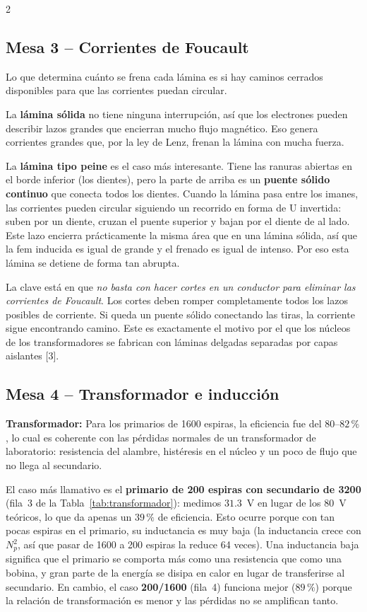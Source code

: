 \documentclass[10pt]{article}
\begin{document}
\begin{multicols}{2}
\subsection*{Mesa 3 – Corrientes de Foucault}

Lo que determina cuánto se frena cada lámina es si hay caminos cerrados disponibles para que las corrientes puedan circular.

La \textbf{lámina sólida} no tiene ninguna interrupción, así que los electrones pueden describir lazos grandes que encierran mucho flujo magnético. Eso genera corrientes grandes que, por la ley de Lenz, frenan la lámina con mucha fuerza.

La \textbf{lámina tipo peine} es el caso más interesante. Tiene las ranuras abiertas en el borde inferior (los dientes), pero la parte de arriba es un \textbf{puente sólido continuo} que conecta todos los dientes. Cuando la lámina pasa entre los imanes, las corrientes pueden circular siguiendo un recorrido en forma de U invertida: suben por un diente, cruzan el puente superior y bajan por el diente de al lado. Este lazo encierra prácticamente la misma área que en una lámina sólida, así que la fem inducida es igual de grande y el frenado es igual de intenso. Por eso esta lámina se detiene de forma tan abrupta.

La clave está en que \emph{no basta con hacer cortes en un conductor para eliminar las corrientes de Foucault}. Los cortes deben romper completamente todos los lazos posibles de corriente. Si queda un puente sólido conectando las tiras, la corriente sigue encontrando camino. Este es exactamente el motivo por el que los núcleos de los transformadores se fabrican con láminas delgadas separadas por capas aislantes [3].

\subsection*{Mesa 4 – Transformador e inducción}

\textbf{Transformador:} Para los primarios de 1600 espiras, la eficiencia fue del $80$--$82\,\%$, lo cual es coherente con las pérdidas normales de un transformador de laboratorio: resistencia del alambre, histéresis en el núcleo y un poco de flujo que no llega al secundario.

El caso más llamativo es el \textbf{primario de 200 espiras con secundario de 3200} (fila~3 de la Tabla~\ref{tab:transformador}): medimos $31.3$~V en lugar de los $80$~V teóricos, lo que da apenas un $39\,\%$ de eficiencia. Esto ocurre porque con tan pocas espiras en el primario, su inductancia es muy baja (la inductancia crece con $N_p^2$, así que pasar de 1600 a 200 espiras la reduce 64 veces). Una inductancia baja significa que el primario se comporta más como una resistencia que como una bobina, y gran parte de la energía se disipa en calor en lugar de transferirse al secundario. En cambio, el caso \textbf{200/1600} (fila~4) funciona mejor ($89\,\%$) porque la relación de transformación es menor y las pérdidas no se amplifican tanto.


\end{multicols}
\end{document}
